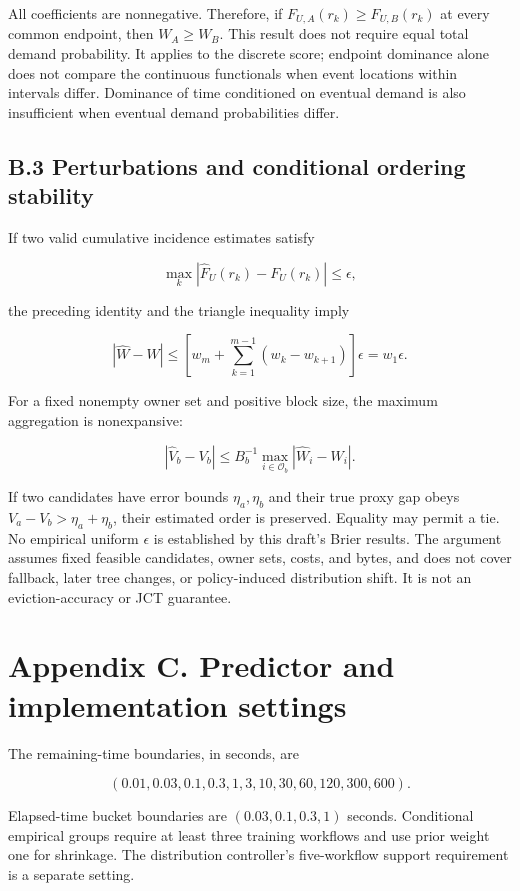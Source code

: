 \documentclass[
  english,
  10pt,
]{article}
\begin{document}
All coefficients are nonnegative. Therefore, if
\(F_{U,A}(r_k)\ge F_{U,B}(r_k)\) at every common endpoint, then
\(W_A\ge W_B\). This result does not require equal total demand
probability. It applies to the discrete score; endpoint dominance alone
does not compare the continuous functionals when event locations within
intervals differ. Dominance of time conditioned on eventual demand is
also insufficient when eventual demand probabilities differ.

\subsection{B.3 Perturbations and conditional ordering
stability}\label{b.3-perturbations-and-conditional-ordering-stability}

If two valid cumulative incidence estimates satisfy

\[
\max_k|\widehat F_U(r_k)-F_U(r_k)|\le\epsilon,
\]

the preceding identity and the triangle inequality imply

\[
|\widehat W-W|\le
\left[w_m+\sum_{k=1}^{m-1}(w_k-w_{k+1})\right]\epsilon
=w_1\epsilon.
\]

For a fixed nonempty owner set and positive block size, the maximum
aggregation is nonexpansive:

\[
|\widehat V_b-V_b|\le B_b^{-1}
\max_{i\in\mathcal O_b}|\widehat W_i-W_i|.
\]

If two candidates have error bounds \(\eta_a,\eta_b\) and their true
proxy gap obeys \(V_a-V_b>\eta_a+\eta_b\), their estimated order is
preserved. Equality may permit a tie. No empirical uniform \(\epsilon\)
is established by this draft's Brier results. The argument assumes fixed
feasible candidates, owner sets, costs, and bytes, and does not cover
fallback, later tree changes, or policy-induced distribution shift. It
is not an eviction-accuracy or JCT guarantee.

\section{Appendix C. Predictor and implementation
settings}\label{appendix-c.-predictor-and-implementation-settings}

The remaining-time boundaries, in seconds, are

\[
(0.01,0.03,0.1,0.3,1,3,10,30,60,120,300,600).
\]

Elapsed-time bucket boundaries are \((0.03,0.1,0.3,1)\) seconds.
Conditional empirical groups require at least three training workflows
and use prior weight one for shrinkage. The distribution controller's
five-workflow support requirement is a separate setting.
\end{document}
